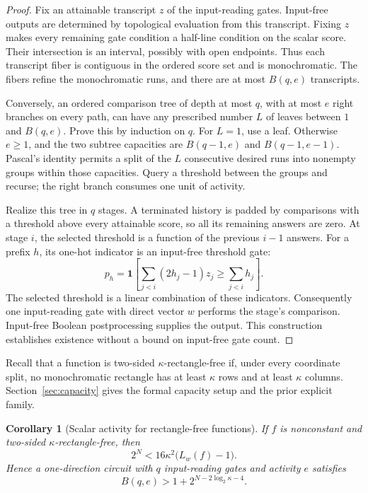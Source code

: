 \documentclass[11pt]{article}
\newtheorem{corollary}[theorem]{Corollary}
\theoremstyle{definition}
\newcommand{\ind}[1]{\mathbf 1[#1]}
\begin{document}
\begin{proof}
Fix an attainable transcript \(z\) of the input-reading gates. Input-free outputs are determined by topological evaluation from this transcript. Fixing \(z\) makes every remaining gate condition a half-line condition on the scalar score. Their intersection is an interval, possibly with open endpoints. Thus each transcript fiber is contiguous in the ordered score set and is monochromatic. The fibers refine the monochromatic runs, and there are at most \(B(q,e)\) transcripts.

Conversely, an ordered comparison tree of depth at most \(q\), with at most \(e\) right branches on every path, can have any prescribed number \(L\) of leaves between \(1\) and \(B(q,e)\). Prove this by induction on \(q\). For \(L=1\), use a leaf. Otherwise \(e\ge1\), and the two subtree capacities are \(B(q-1,e)\) and \(B(q-1,e-1)\). Pascal's identity permits a split of the \(L\) consecutive desired runs into nonempty groups within those capacities. Query a threshold between the groups and recurse; the right branch consumes one unit of activity.

Realize this tree in \(q\) stages. A terminated history is padded by comparisons with a threshold above every attainable score, so all its remaining answers are zero. At stage \(i\), the selected threshold is a function of the previous \(i-1\) answers. For a prefix \(h\), its one-hot indicator is an input-free threshold gate:
\[
 p_h=\ind{\sum_{j<i}(2h_j-1)z_j\ge\sum_{j<i}h_j}.
\]
The selected threshold is a linear combination of these indicators. Consequently one input-reading gate with direct vector \(w\) performs the stage's comparison. Input-free Boolean postprocessing supplies the output. This construction establishes existence without a bound on input-free gate count.
\end{proof}

Recall that a function is two-sided \(\kappa\)-rectangle-free if, under every coordinate split, no monochromatic rectangle has at least \(\kappa\) rows and at least \(\kappa\) columns. Section~\ref{sec:capacity} gives the formal capacity setup and the prior explicit family.

\begin{corollary}[Scalar activity for rectangle-free functions]\label{cor:scalar_activity_capacity}
If \(f\) is nonconstant and two-sided \(\kappa\)-rectangle-free, then
\[
 2^N<16\kappa^2\bigl(L_w(f)-1\bigr).
\]
Hence a one-direction circuit with \(q\) input-reading gates and activity \(e\) satisfies
\[
 B(q,e)>1+2^{N-2\log_2\kappa-4}.
\]
\end{corollary}
\end{document}
